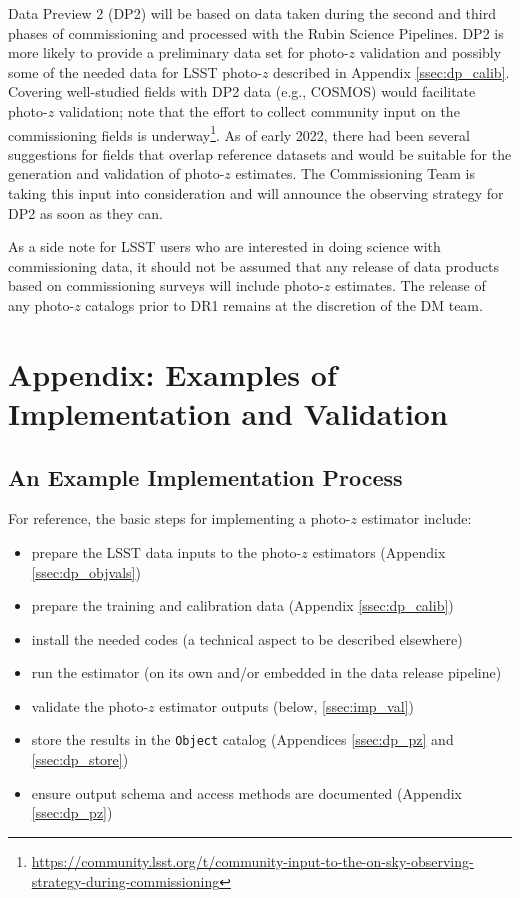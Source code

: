 \documentclass[DM,authoryear,toc]{lsstdoc}
\begin{document}
Data Preview 2 (DP2) will be based on data taken during the second and third phases of commissioning and processed with the Rubin Science Pipelines. 
DP2 is more likely to provide a preliminary data set for photo-$z$ validation and possibly some of the needed data for LSST photo-$z$ described in Appendix \ref{ssec:dp_calib}. 
Covering well-studied fields with DP2 data (e.g., COSMOS) would facilitate photo-$z$ validation; note that the effort to collect community input on the commissioning fields is underway\footnote{\url{https://community.lsst.org/t/community-input-to-the-on-sky-observing-strategy-during-commissioning}}.
As of early 2022, there had been several suggestions for fields that overlap reference datasets and would be suitable for the generation and validation of photo-$z$ estimates.
The Commissioning Team is taking this input into consideration and will announce the observing strategy for DP2 as soon as they can.

As a side note for LSST users who are interested in doing science with commissioning data, it should not be assumed that any release of data products based on commissioning surveys will include photo-$z$ estimates.
The release of any photo-$z$ catalogs prior to DR1 remains at the discretion of the DM team.



\clearpage
\appendix 

\section{Appendix: Examples of Implementation and Validation}\label{sec:imp}

\subsection{An Example Implementation Process}\label{ssec:imp_imp}

For reference, the basic steps for implementing a photo-$z$ estimator include:
\vspace{-15pt}
\begin{itemize}
\item prepare the LSST data inputs to the photo-$z$ estimators (Appendix \ref{ssec:dp_objvals})
\item prepare the training and calibration data (Appendix \ref{ssec:dp_calib})
\item install the needed codes (a technical aspect to be described elsewhere)
\item run the estimator (on its own and/or embedded in the data release pipeline)
\item validate the photo-$z$ estimator outputs (below, \ref{ssec:imp_val})
\item store the results in the {\tt Object} catalog (Appendices \ref{ssec:dp_pz} and \ref{ssec:dp_store})
\item ensure output schema and access methods are documented (Appendix \ref{ssec:dp_pz})
\end{itemize}
\end{document}
